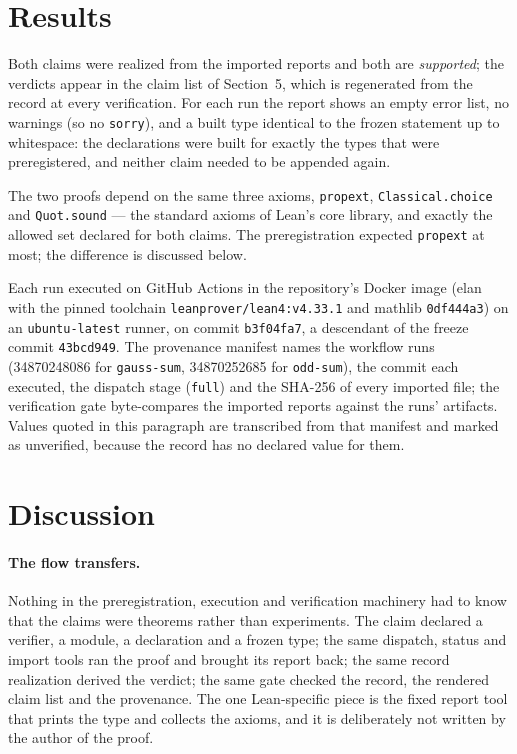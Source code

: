 \documentclass[journal,article,submit,pdftex,moreauthors]{Definitions/mdpi}
\providecommand{\unverified}[1]{#1}
\begin{document}
\section{Results}

Both claims were realized from the imported reports and both are \emph{supported}; the verdicts appear in the claim list of Section~5, which is regenerated from the record at every verification. For each run the report shows an empty error list, no warnings (so no \texttt{sorry}), and a built type identical to the frozen statement up to whitespace: the declarations were built for exactly the types that were preregistered, and neither claim needed to be appended again.

The two proofs depend on the same three axioms, \texttt{propext}, \texttt{Classical.choice} and \texttt{Quot.sound} --- the standard axioms of Lean's core library, and exactly the allowed set declared for both claims. The preregistration expected \texttt{propext} at most; the difference is discussed below.

Each run executed on GitHub Actions in the repository's Docker image (elan with the pinned toolchain \texttt{leanprover/lean4:v4.33.1} and mathlib \unverified{\texttt{0df444a3}}) on an \texttt{ubuntu-latest} runner, on commit \unverified{\texttt{b3f04fa7}}, a descendant of the freeze commit \unverified{\texttt{43bcd949}}. The provenance manifest names the workflow runs (\unverified{34870248086} for \texttt{gauss-sum}, \unverified{34870252685} for \texttt{odd-sum}), the commit each executed, the dispatch stage (\texttt{full}) and the SHA-256 of every imported file; the verification gate byte-compares the imported reports against the runs' artifacts. Values quoted in this paragraph are transcribed from that manifest and marked as unverified, because the record has no declared value for them.

\section{Discussion}

\paragraph{The flow transfers.} Nothing in the preregistration, execution and verification machinery had to know that the claims were theorems rather than experiments. The claim declared a verifier, a module, a declaration and a frozen type; the same dispatch, status and import tools ran the proof and brought its report back; the same record realization derived the verdict; the same gate checked the record, the rendered claim list and the provenance. The one Lean-specific piece is the fixed report tool that prints the type and collects the axioms, and it is deliberately not written by the author of the proof.
\end{document}

